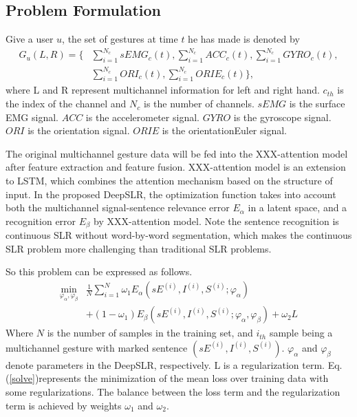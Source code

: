 \documentclass[10pt, conference, letterpaper]{IEEEtran}
\begin{document}
\subsection{Problem Formulation}
Give a user $u$, the set of gestures at time $t$ he has made is denoted by
\begin{equation}
\label{definition}
\begin{aligned}
 G_u(L,R)=\{&\sum_{i=1}^{N_c}sEMG_c(t),\sum_{i=1}^{N_c}ACC_c(t),\sum_{i=1}^{N_c}GYRO_c(t),\\
 &\sum_{i=1}^{N_c}ORI_c(t),\sum_{i=1}^{N_c}ORIE_c(t)\},
\end{aligned}
\end{equation}
where L and R represent multichannel information for left and right hand. $c_{th}$ is the index of the channel and $N_c$ is the number of channels. $sEMG$ is the surface EMG signal. $ACC$ is the accelerometer signal. $GYRO$ is the gyroscope signal. $ORI$ is the orientation signal. $ORIE$ is the orientationEuler signal.

The original multichannel gesture data will be fed into the XXX-attention model after feature extraction and feature fusion. XXX-attention model is an extension to LSTM, which combines the attention mechanism based on the structure of input. In the proposed DeepSLR, the optimization function takes into account both the multichannel signal-sentence relevance error $E_\alpha$ in a latent space, and a recognition error $E_\beta$ by XXX-attention model. Note the sentence recognition is continuous SLR without word-by-word segmentation, which makes the continuous SLR problem more challenging than traditional SLR problems.

So this problem can be expressed as follows.
\begin{equation}
\label{solve}
\begin{aligned}
 \min_{\varphi_\alpha, \varphi_\beta}&\frac{1}{N}\sum_{i=1}^{N}\omega_1E_\alpha(sE^{(i)},I^{(i)},S^{(i)};\varphi_\alpha)\\
 &+(1-\omega_1)E_\beta(sE^{(i)},I^{(i)},S^{(i)};\varphi_\alpha,\varphi_\beta)+\omega_2L
\end{aligned}
\end{equation}
Where $N$ is the number of samples in the training set, and $i_{th}$ sample being a multichannel gesture with marked sentence $(sE^{(i)},I^{(i)},S^{(i)})$. $\varphi_\alpha$ and $\varphi_\beta$ denote parameters in the DeepSLR, respectively. L is a regularization term. Eq. (\ref{solve})represents the minimization of the mean loss over training data with some regularizations. The balance between the loss term and the regularization term is achieved by weights $\omega_1$ and $\omega_2$.
\end{document}
